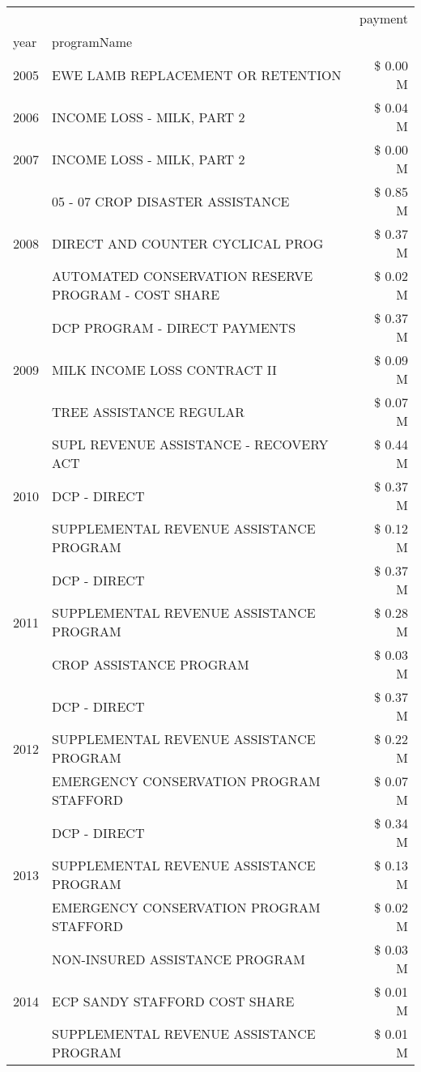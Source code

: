 \begin{tabular}{llr}
\toprule
 &  & payment \\
year & programName &  \\
\midrule
2005 & EWE LAMB REPLACEMENT OR RETENTION & \$ 0.00 M \\
\cline{1-3}
2006 & INCOME LOSS - MILK, PART 2 & \$ 0.04 M \\
\cline{1-3}
2007 & INCOME LOSS - MILK, PART 2 & \$ 0.00 M \\
\cline{1-3}
\multirow[t]{3}{*}{2008} & 05 - 07 CROP DISASTER ASSISTANCE & \$ 0.85 M \\
 & DIRECT AND COUNTER CYCLICAL PROG & \$ 0.37 M \\
 & AUTOMATED CONSERVATION RESERVE PROGRAM - COST SHARE & \$ 0.02 M \\
\cline{1-3}
\multirow[t]{3}{*}{2009} & DCP PROGRAM - DIRECT PAYMENTS & \$ 0.37 M \\
 & MILK INCOME LOSS CONTRACT II & \$ 0.09 M \\
 & TREE ASSISTANCE REGULAR & \$ 0.07 M \\
\cline{1-3}
\multirow[t]{3}{*}{2010} & SUPL REVENUE ASSISTANCE - RECOVERY ACT & \$ 0.44 M \\
 & DCP - DIRECT & \$ 0.37 M \\
 & SUPPLEMENTAL REVENUE ASSISTANCE PROGRAM & \$ 0.12 M \\
\cline{1-3}
\multirow[t]{3}{*}{2011} & DCP - DIRECT & \$ 0.37 M \\
 & SUPPLEMENTAL REVENUE ASSISTANCE PROGRAM & \$ 0.28 M \\
 & CROP ASSISTANCE PROGRAM & \$ 0.03 M \\
\cline{1-3}
\multirow[t]{3}{*}{2012} & DCP - DIRECT & \$ 0.37 M \\
 & SUPPLEMENTAL REVENUE ASSISTANCE PROGRAM & \$ 0.22 M \\
 & EMERGENCY CONSERVATION PROGRAM STAFFORD & \$ 0.07 M \\
\cline{1-3}
\multirow[t]{3}{*}{2013} & DCP - DIRECT & \$ 0.34 M \\
 & SUPPLEMENTAL REVENUE ASSISTANCE PROGRAM & \$ 0.13 M \\
 & EMERGENCY CONSERVATION PROGRAM STAFFORD & \$ 0.02 M \\
\cline{1-3}
\multirow[t]{3}{*}{2014} & NON-INSURED ASSISTANCE PROGRAM & \$ 0.03 M \\
 & ECP SANDY STAFFORD COST SHARE & \$ 0.01 M \\
 & SUPPLEMENTAL REVENUE ASSISTANCE PROGRAM & \$ 0.01 M \\

\end{tabular}
